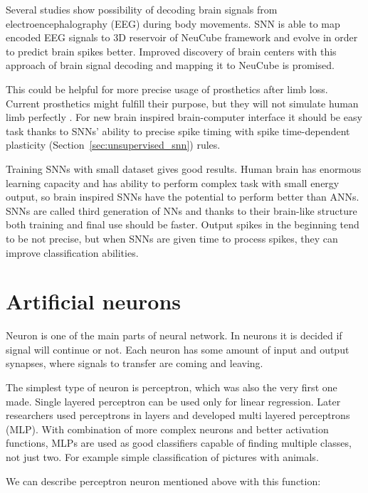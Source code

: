 Several studies show possibility of decoding brain signals from electroencephalography (EEG) during body movements. SNN is able to map encoded EEG signals to 3D reservoir of NeuCube framework and evolve in order to predict brain spikes better. Improved discovery of brain centers with this approach of brain signal decoding and mapping it to NeuCube is promised. \cite{neucube}

This could be helpful for more precise usage of prosthetics after limb loss. Current prosthetics might fulfill their purpose, but they will not simulate human limb perfectly . For new brain inspired brain-computer interface it should be easy task thanks to SNNs' ability to precise spike timing with spike time-dependent plasticity (Section~\ref{sec:unsupervised_snn}) rules. \cite{stdp-biological}

Training SNNs with small dataset gives good results. Human brain has enormous learning capacity and has ability to perform complex task with small energy output, so brain inspired SNNs have the potential to perform better than ANNs. SNNs are called third generation of NNs and thanks to their brain-like structure both training and final use should be faster. Output spikes in the beginning tend to be not precise, but when SNNs are given time to process spikes, they can improve classification abilities. \cite{stdp-biological}

%
%

\section{Artificial neurons}
\label{sec:ann_neurons}

Neuron is one of the main parts of neural network. In neurons it is decided if signal will continue or not. Each neuron has some amount of input and output synapses, where signals to transfer are coming and leaving.

The simplest type of neuron is perceptron, which was also the very first one made. Single layered perceptron can be used only for linear regression. Later researchers used perceptrons in layers and developed multi layered perceptrons (MLP). With combination of more complex neurons and better activation functions, MLPs are used as good classifiers capable of finding multiple classes, not just two. For example simple classification of pictures with animals.

We can describe perceptron neuron mentioned above with this function:


